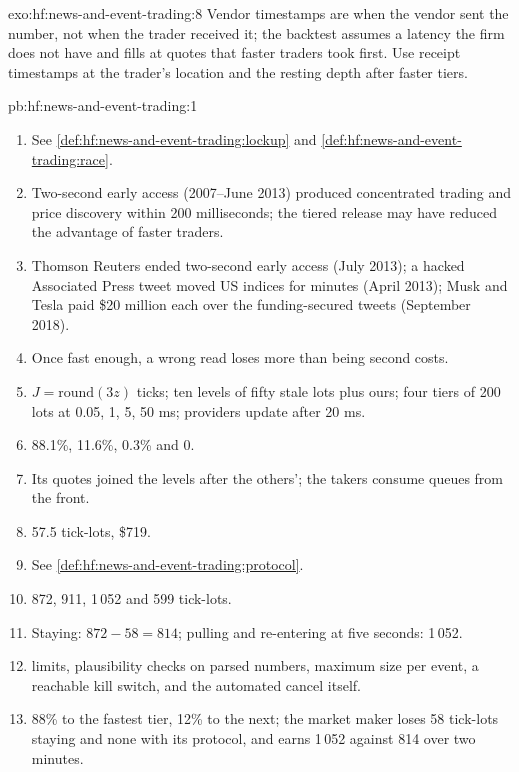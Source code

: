 \begin{solution}{exo:hf:news-and-event-trading:8}
Vendor timestamps are when the vendor sent the number, not when the trader received it; the backtest assumes a latency the firm does not have and
fills at quotes that faster traders took first. Use receipt timestamps at the trader's location and the resting depth after faster tiers.
\end{solution}

\begin{solution}{pb:hf:news-and-event-trading:1}
\begin{enumerate}
\item See \cref{def:hf:news-and-event-trading:lockup} and \cref{def:hf:news-and-event-trading:race}.
\item Two-second early access (2007--June 2013) produced concentrated trading and price discovery within 200 milliseconds; the tiered release may have
reduced the advantage of faster traders.
\item Thomson Reuters ended two-second early access (July 2013); a hacked Associated Press tweet moved US indices for minutes (April 2013); Musk and
Tesla paid \$20 million each over the funding-secured tweets (September 2018).
\item Once fast enough, a wrong read loses more than being second costs.
\item $J=\mathrm{round}(3z)$ ticks; ten levels of fifty stale lots plus ours; four tiers of 200 lots at 0.05, 1, 5, 50 ms; providers update after 20
ms.
\item 88.1\%, 11.6\%, 0.3\% and 0.
\item Its quotes joined the levels after the others'; the takers consume queues from the front.
\item 57.5 tick-lots, \$719.
\item See \cref{def:hf:news-and-event-trading:protocol}.
\item 872, 911, 1\,052 and 599 tick-lots.
\item Staying: $872-58=814$; pulling and re-entering at five seconds: 1\,052.
\item {} limits, plausibility checks on parsed numbers, maximum size per event, a reachable kill switch, and the automated cancel itself.
\item 88\% to the fastest tier, 12\% to the next; the market maker loses 58 tick-lots staying and none with its protocol, and earns 1\,052 against 814
over two minutes.

\end{enumerate}
\end{solution}
